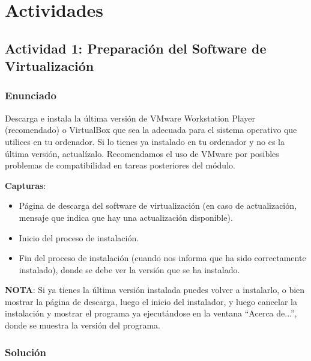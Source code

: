 \section{Actividades}

\subsection{Actividad 1: Preparación del Software de Virtualización}

\subsubsection{Enunciado}
Descarga e instala la última versión de VMware Workstation Player (recomendado) o VirtualBox que sea la adecuada para el sistema operativo que utilices en tu ordenador. Si lo tienes ya instalado en tu ordenador y no es la última versión, actualízalo. Recomendamos el uso de VMware por posibles problemas de compatibilidad en tareas posteriores del módulo.

\textbf{Capturas}:

\begin{itemize}
    \item Página de descarga del software de virtualización (en caso de actualización, mensaje que indica que hay una actualización disponible).
    \item Inicio del proceso de instalación.
    \item Fin del proceso de instalación (cuando nos informa que ha sido correctamente instalado), donde se debe ver la versión que se ha instalado.
\end{itemize}

\textbf{NOTA}: Si ya tienes la última versión instalada puedes volver a instalarlo, o bien mostrar la página de descarga, luego el inicio del instalador, y luego cancelar la instalación y mostrar el programa ya ejecutándose en la ventana ``Acerca de...'', donde se muestra la versión del programa.

\subsubsection{Solución}

